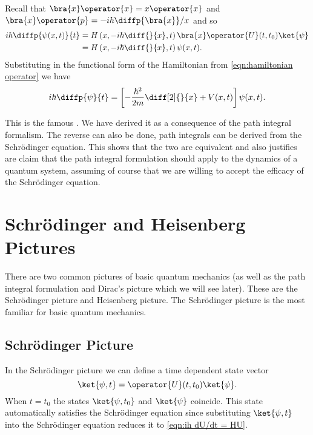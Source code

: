 \documentclass[fleqn]{NotesClass}
\begin{document}
    Recall that \(\bra{x}\operator{x} = x\operator{x}\) and \(\bra{x}\operator{p} = -i\hbar\diffp{\bra{x}}/{x}\) and so
    \begin{align}
        i\hbar\diffp{\psi(x, t)}{t} &= H\left( x, -i\hbar\diff{}{x}, t \right) \bra{x}\operator{U}(t, t_0) \ket{\psi}\\
        &=  H\left( x, -i\hbar\diff{}{x}, t \right)\psi(x, t).
    \end{align}
    Substituting in the functional form of the Hamiltonian from \cref{eqn:hamiltonian operator} we have
    \begin{equation}
        i\hbar\diffp{\psi}{t} = \left[ -\frac{\hbar^2}{2m}\diff[2]{}{x} + V(x, t) \right] \psi(x, t).
    \end{equation}
    
    This is the famous .
    We have derived it as a consequence of the path integral formalism.
    The reverse can also be done, path integrals can be derived from the Schr\"odinger equation.
    This shows that the two are equivalent and also justifies are claim that the path integral formulation should apply to the dynamics of a quantum system, assuming of course that we are willing to accept the efficacy of the Schr\"odinger equation.
    
    \section{\texorpdfstring{Schr\"odinger}{Schrodinger} and Heisenberg Pictures}
    There are two common pictures of basic quantum mechanics (as well as the path integral formulation and Dirac's picture which we will see later).
    These are the Schr\"odinger picture and Heisenberg picture.
    The Schr\"odinger picture is the most familiar for basic quantum mechanics.
    
    \subsection{\texorpdfstring{Schr\"odinger}{Schrodinger} Picture}
    In the Schr\"odinger picture we can define a time dependent state vector
    \begin{equation}
        \ket{\psi, t} = \operator{U}(t, t_0)\ket{\psi}.
    \end{equation}
    When \(t = t_0\) the states \(\ket{\psi, t_0}\) and \(\ket{\psi}\) coincide.
    This state automatically satisfies the Schr\"odinger equation since substituting \(\ket{\psi, t}\) into the Schr\"odinger equation reduces it to \cref{eqn:ih dU/dt = HU}.
    
\end{document}
